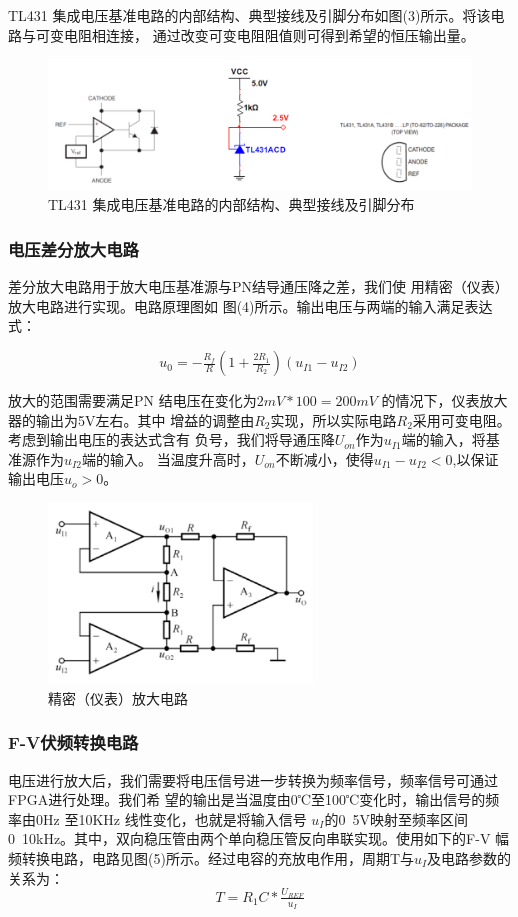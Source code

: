 \documentclass[12pt,a4paper]{ctexart}
\begin{document}
TL431 集成电压基准电路的内部结构、典型接线及引脚分布如图(3)所示。将该电路与可变电阻相连接，
通过改变可变电阻阻值则可得到希望的恒压输出量。

\begin{figure}[H]
  \centering
  \includegraphics[width=12cm]{pic/2.1.3.png}
  \caption{TL431 集成电压基准电路的内部结构、典型接线及引脚分布}
\end{figure}

\subsubsection{电压差分放大电路}
差分放大电路用于放大电压基准源与PN结导通压降之差，我们使
用精密（仪表）放大电路进行实现。电路原理图如
图(4)所示。输出电压与两端的输入满足表达式：

\begin{equation}
  u_0=-\tfrac{R_f}{R}(1+\tfrac{2R_1}{R_2})(u_{I1}-u_{I2})
\end{equation}

放大的范围需要满足PN 结电压在变化为$2mV*100=200mV$
的情况下，仪表放大器的输出为5V左右。其中
增益的调整由$R_2$实现，所以实际电路$R_2$采用可变电阻。考虑到输出电压的表达式含有
负号，我们将导通压降$U_{on}$作为$u_{I1}$端的输入，将基准源作为$u_{I2}$端的输入。
当温度升高时，$U_{on}$不断减小，使得$u_{I1}-u_{I2}<0$,以保证输出电压$u_o>0$。

\begin{figure}[H]
  \centering
  \includegraphics[width=7cm]{pic/2.1.4.png}
  \caption{精密（仪表）放大电路}
\end{figure}

\subsubsection{F-V伏频转换电路}
电压进行放大后，我们需要将电压信号进一步转换为频率信号，频率信号可通过FPGA进行处理。我们希
望的输出是当温度由0℃至100℃变化时，输出信号的频率由0Hz 至10KHz 线性变化，也就是将输入信号
$u_I$的0~5V映射至频率区间0~10kHz。其中，双向稳压管由两个单向稳压管反向串联实现。使用如下的F-V
幅频转换电路，电路见图(5)所示。经过电容的充放电作用，周期T与$u_I$及电路参数的关系为：
\begin{equation}
  T=R_1C*\tfrac{U_{REF}}{u_I}
\end{equation}
\end{document}

